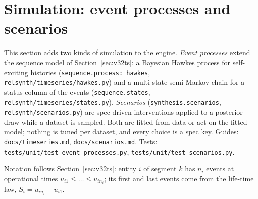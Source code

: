 \section{Simulation: event processes and scenarios}\label{sec:v71sim}
\setcounter{savedpropsim}{\value{proposition}}
\setcounter{proposition}{1819}
This section adds two kinds of simulation to the engine. \emph{Event processes} extend the sequence model of
Section~\ref{sec:v32ts}: a Bayesian Hawkes process for self-exciting histories (\texttt{sequence.process: hawkes},
\texttt{relsynth/timeseries/hawkes.py}) and a multi-state semi-Markov chain for a status column of the events
(\texttt{sequence.states}, \texttt{relsynth/timeseries/states.py}). \emph{Scenarios} (\texttt{synthesis.scenarios},
\texttt{relsynth/scenarios.py}) are spec-driven interventions applied to a posterior draw while a dataset is sampled.
Both are fitted from data or act on the fitted model; nothing is tuned per dataset, and every choice is a spec key.
Guides: \texttt{docs/timeseries.md}, \texttt{docs/scenarios.md}. Tests: \texttt{tests/unit/test\_event\_processes.py},
\texttt{tests/unit/test\_scenarios.py}.

Notation follows Section~\ref{sec:v32ts}: entity $i$ of segment $k$ has $n_i$ events at operational times
$u_{i1}\le\dots\le u_{in_i}$; its first and last events come from the life-time law, $S_i=u_{in_i}-u_{i1}$.

